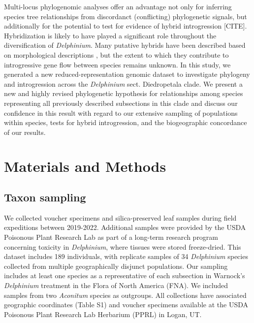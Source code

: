 \documentclass[11pt]{article}
\begin{document}
Multi-locus phylogenomic analyses offer an advantage not only for inferring
species tree relationships from discordanct (conflicting) phylogenetic signals, 
but additionally for the potential to test for evidence of hybrid introgression
[CITE].
% 
Hybridization is likely to have played a significant role throughout the 
diversification of \emph{Delphinium}. 
Many putative hybrids have been described based on morphological descriptions 
\citep{ewan_1945, warnock_1997},
but the extent to which they contribute to introgressive gene 
flow between species remains unknown.
% 
% 
In this study, we generated a new reduced-representation genomic dataset to 
investigate phylogeny and introgression across the \emph{Delphinium} sect. 
Diedropetala clade. 
% 
We present a new and highly revised phylogenetic hypothesis for relationships
among species representing all previously described subsections in this clade 
and discuss our confidence in this result with regard to our 
extensive sampling of populations within species, tests for hybrid 
introgression, and the biogeographic concordance of our results.


\section{Materials and Methods}

\subsection{Taxon sampling}
We collected voucher specimens and silica-preserved leaf samples during field expeditions
between 2019-2022. Additional samples were provided by the USDA Poisonous Plant Research
Lab as part of a long-term research program concerning toxicity in \emph{Delphinium}, where
tissues were stored freeze-dried.
% 
This dataset includes 189 individuals, with replicate samples of 34 \emph{Delphinium} 
species collected from multiple geographically disjunct populations. Our sampling includes
at least one species as a representative of each subsection in Warnock’s \emph{Delphinium}
treatment in the Flora of North America (FNA). 
We included samples from two \emph{Aconitum} species as outgroups.
All collections have associated geographic coordinates (Table S1) and voucher 
specimens available at the USDA Poisonous Plant Research Lab Herbarium (PPRL)
in Logan, UT.
\end{document}
